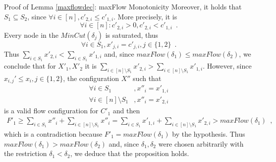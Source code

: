 \begin{sepproof}{Proof of Lemma \ref{maxflowdec}: maxFlow Monotonicity}
  Moreover, it holds that $S_1 \subseteq S_2$, since $\forall i \in [n], c'_{2, i} \leq c'_{1, i}$. More precisely, it is
  \begin{equation*}
    \forall i \in [n] : c'_{2, i} > 0, c'_{2, i} < c'_{1, i} \enspace.
  \end{equation*}
  Every node in the $MinCut\left(\delta_j\right)$ is saturated, thus
  \begin{equation*}
    \forall i \in S_1, x'_{j, i} = c'_{j, i}, j \in \{1, 2\} \enspace.
  \end{equation*}
  Thus $\sum\limits_{i \in S_1} x'_{2, i} < \sum\limits_{i \in S_1}x'_{1, i}$ and, since $maxFlow(\delta_1) \leq
  maxFlow(\delta_2)$, we conclude that for $X'_1, X'_2$ it is $\sum\limits_{i \in [n] \setminus S_1}x'_{2, i} >
  \sum\limits_{i \in [n] \setminus S_1}x'_{1, i}$. However, since $x_{i,j}' \leq x_i, j \in \{1,2\}$, the configuration $X''$
  such that
  \begin{align*}
    \forall i \in S_1&, x''_i = x'_{1, i} \\
    \forall i \in [n] \setminus S_1&, x''_i = x'_{2, i}
  \end{align*}
  is a valid flow configuration for $C'_1$ and then
  \begin{equation*}
  \begin{gathered}
    F'_1 \geq \sum\limits_{i \in S_1}x''_i + \sum\limits_{i \in [n] \setminus S_1}x''_i = \sum\limits_{i \in S_1}x'_{1, i} +
    \sum\limits_{i \in [n] \setminus S_1}x'_{2, i} > maxFlow\left(\delta_1\right)
    \enspace,
  \end{gathered}
  \end{equation*}
  which is a contradiction because $F'_1 = maxFlow\left(\delta_1\right)$ by the hypothesis. Thus
  $maxFlow\left(\delta_1\right) > maxFlow\left(\delta_2\right)$ and, since $\delta_1, \delta_2$ were chosen arbitrarily with
  the restriction $\delta_1 < \delta_2$, we deduce that the proposition holds.
\end{sepproof}
